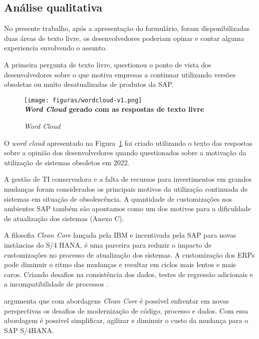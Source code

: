 \subsection{\esp Análise qualitativa }

No presente trabalho, após a apresentação do formulário, foram disponibilizadas duas áreas de texto livre, os desenvolvedores poderiam opinar e contar alguma experiencia envolvendo o assunto.

A primeira pergunta de texto livre, questionou o ponto de vista dos desenvolvedores sobre o que motiva empresas a continuar utilizando versões obsoletas ou muito desatualizadas de produtos da SAP.

\begin{figure}[ht]
	\centering	
	\caption[\hspace{0.1cm}Q1.]{\textit{Word Cloud}}
	\vspace{-0.4cm}
	\texttt{[image: figuras/wordcloud-v1.png]}
	\vspace{-0.2cm}
	\\\textbf{\footnotesize \textit{Word Cloud } gerado com as respostas de texto livre }	
	\label{fig:wordcloud}
\end{figure}
\vspace{-0.5cm}

O \textit{word cloud} apresentado na Figura~\ref{fig:wordcloud} foi criado utilizando o texto das respostas sobre a opinião dos desenvolvedores quando questionados sobre a motivação da utilização de sistemas obsoletos em 2022. 

A gestão de TI conservadora e a falta de recursos para investimentos em grandes mudanças foram considerados os principais motivos da utilização continuada de sistemas em situação de obsolescência. A quantidade de customizações nos ambientes SAP também são apontamos como um dos motivos para a dificuldade de atualização dos sistemas (Anexo C).

A filosofia \textit{Clean Core} lançada pela IBM e incentivada pela SAP para novas instâncias do S/4 HANA, é uma parceira para reduzir o impacto de customizações no processo de atualização dos sistemas. A customização dos ERPs  pode diminuir o ritmo das mudanças e resultar em ciclos mais lentos e mais caros. Criando desafios na consistência dos dados, testes de regressão adicionais e a incompatibilidade de processos \cite{cleancore}.

 argumenta que com abordagens \textit{Clean Core} é possível enfrentar em novas perspectivas os desafios de modernização de código, processo e dados. Com essa abordagem é possível simplificar, agilizar e diminuir o custo da mudança para o SAP S/4HANA.

